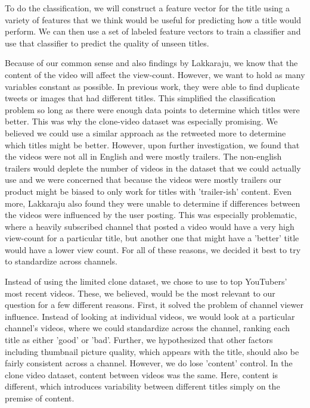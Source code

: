 \documentclass[a4paper,12pt]{article}
\begin{document}
To do the classification, we will construct a feature vector for the title using a variety of features that we think would be useful for predicting how a title would perform. We can then use a set of labeled feature vectors to train a classifier and use that classifier to predict the quality of unseen titles.

Because of our common sense and also findings by Lakkaraju, we know that the content of the video will affect the view-count. However, we want to hold as many variables constant as possible. In previous work, they were able to find duplicate tweets or images that had different titles. This simplified the classification problem so long as there were enough data points to determine which titles were better. This was why the clone-video dataset was especially promising. We believed we could use a similar approach as the retweeted more to determine which titles might be better. However, upon further investigation, we found that the videos were not all in English and were mostly trailers. The non-english trailers would deplete the number of videos in the dataset that we could actually use and we were concerned that because the videos were mostly trailers our product might be biased to only work for titles with 'trailer-ish' content. Even more, Lakkaraju also found they were unable to determine if differences between the videos were influenced by the user posting. This was especially problematic, where a heavily subscribed channel that posted a video would have a very high view-count for a particular title, but another one that might have a 'better' title would have a lower view count. For all of these reasons, we decided it best to try to standardize across channels.

Instead of using the limited clone dataset, we chose to use to top YouTubers' most recent videos. These, we believed, would be the most relevant to our question for a few different reasons. First, it solved the problem of channel viewer influence. Instead of looking at individual videos, we would look at a particular channel's videos, where we could standardize across the channel, ranking each title as either 'good' or 'bad'. Further, we hypothesized that other factors including thumbnail picture quality, which appears with the title, should also be fairly consistent across a channel. However, we do lose 'content' control. In the clone video dataset, content between videos was the same. Here, content is different, which introduces variability between different titles simply on the premise of content. 
\end{document}
